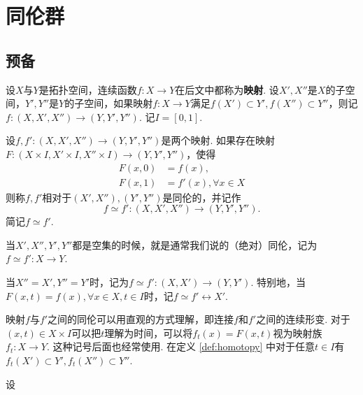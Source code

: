 \chapter{同伦群}
\section{预备}
设$X$与$Y$是拓扑空间，连续函数$f:X\to Y$在后文中都称为{\bfseries 映射}. 设$X',X''$是$X$的子空间，$Y',Y''$是$Y$的子空间，如果映射$f:X\to Y$满足$f(X')\subset Y',f(X'')\subset Y''$，则记$f:(X,X',X'')\to(Y,Y',Y'')$. 记$I=[0,1]$.

\begin{definition}\label{def:homotopy}
    设$f,f':(X,X',X'')\to(Y,Y',Y'')$是两个映射. 如果存在映射$F:(X\times I,X'\times I,X''\times I)\to (Y,Y',Y'')$，使得
    \begin{align*}
        F(x,0)&=f(x),\\
        F(x,1)&=f'(x),\forall x\in X
    \end{align*}
    则称$f,f'$相对于$(X',X''),(Y',Y'')$是同伦的，并记作
    \[
        f\simeq f':(X,X',X'')\to(Y,Y',Y'').
    \]
    简记$f\simeq f'$.
\end{definition}

\begin{remark}
    当$X',X'',Y',Y''$都是空集的时候，就是通常我们说的（绝对）同伦，记为$f\simeq f':X\to Y$.

    当$X''=X',Y''=Y'$时，记为$f\simeq f':(X,X')\to (Y,Y')$. 特别地，当$F(x,t)=f(x),\forall x\in X,t\in I$时，记$f\simeq f'\rel X'$.
\end{remark}

\begin{remark}
    映射$f$与$f'$之间的同伦可以用直观的方式理解，即连接$f$和$f'$之间的连续形变. 对于$(x,t)\in X\times I$可以把$t$理解为时间，可以将$f_t(x)=F(x,t)$视为映射族$f_t:X\to Y$. 这种记号后面也经常使用. 在定义 \ref{def:homotopy} 中对于任意$t\in I$有$f_t(X')\subset Y',f_t(X'')\subset Y''$.
\end{remark}

\begin{example}
    设  
\end{example}